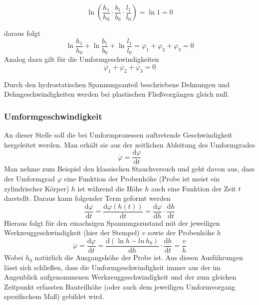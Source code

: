 \documentclass[12pt,a4paper,parskip,twoside,BCOR5mm,headsepline]{scrartcl}
\begin{document}
\begin{description*}
 
 \begin{equation}\ln (\frac{h_1}{h_0} \cdot \frac{b_1}{b_0} \cdot \frac{l_1}{l_0}) = \ln 1 = 0\end{equation} 
 
daraus folgt \begin{equation}
\ln\frac{h_1}{h_0}+\ln\frac{b_1}{b_0}+\ln\frac{l_1}{l_0}=\varphi_1+\varphi_2+\varphi_3=0
\end{equation}
Analog dazu gilt für die Umformgeschwindigkeiten
\begin{equation}
\dot{\varphi_1}+\dot{\varphi_2}+\dot{\varphi_3}=0
\end{equation}

Durch den hydrostatischen Spannungsanteil beschriebene Dehnungen und Dehngeschwindigkeiten werden bei plastischen Fließvorgängen gleich null. \autocite[24-28]{fu}
\subsubsection{Umformgeschwindigkeit}
An dieser Stelle soll die bei Umformprozessen auftretende Geschwindigkeit hergeleitet werden. Man erhält sie aus der zeitlichen Ableitung des Umformgrades
\begin{equation}
\dot{\varphi} = \frac{\text{d}\varphi}{\text{d}t}
\end{equation}
Man nehme zum Beispiel den klassischen Stauchversuch und geht davon aus, dass der Umformgrad $ \varphi $ eine Funktion der Probenhöhe (Probe ist meist ein zylindrischer Körper) $ h $ ist während die Höhe $ h $ auch eine Funktion der Zeit $ t $ darstellt. Daraus kann folgender Term geformt werden 
\begin{equation}
\frac{\text{d}\varphi}{\text{d}t} = \frac{\text{d} \varphi (h(t))}{\text{d}t}= \frac{\text{d}\varphi}{\text{d}h} \cdot \frac{\text{d}h}{\text{d}t}
\end{equation}
Hieraus folgt für den einachsigen Spannungszustand mit der jeweiligen Werkzeuggeschwindigkeit (hier der Stempel) $ v $ sowie der Probenhöhe $ h $
\begin{equation}
\dot{\varphi}=\frac{\text{d}\varphi}{\text{d}t}= \frac{\text{d}(\ln h - ln  \, h_0)}{\text{d}h}\cdot \frac{\text{d}h}{\text{d}t} = \frac{v}{h}
\end{equation}
Wobei $ h_0 $ natürlich die Ausgangshöhe der Probe ist. \autocite[65]{hu}
Aus diesen Ausführungen lässt sich schließen,  dass die Umformgeschwindigkeit immer aus der im Augenblick aufgenommenen Werkzeuggeschwindigkeit und der zum gleichen Zeitpunkt erfassten Bauteilhöhe (oder auch dem jeweiligen Umformvorgang spezifischem   Maß) gebildet wird.

\end{description*}
\end{document}
